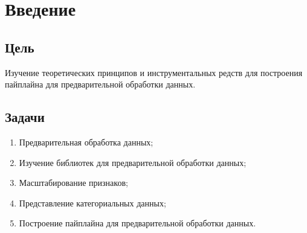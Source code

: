 \chapter{Введение}
\label{ch:intro}

\section{Цель}  

Изучение теоретических принципов и
инструментальных редств для построения пайплайна для предварительной
обработки данных.


\section{Задачи} 

\begin{enumerate} 
\item Предварительная обработка данных;
\item Изучение библиотек для предварительной обработки данных;
\item Масштабирование признаков;
\item Представление категориальных данных;
\item Построение пайплайна для предварительной обработки данных.
\end{enumerate}
  

\endinput 